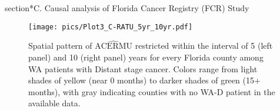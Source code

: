 \documentclass[aoas]{imsart}
\theoremstyle{plain}
\theoremstyle{definition}
\begin{document}
   









section*{C. Causal analysis of Florida Cancer Registry (FCR) Study}
\begin{figure}[ht]
\centering
\texttt{[image: pics/Plot3\_C-RATU\_5yr\_10yr.pdf]}
\caption{Spatial pattern of  $\widehat{\text{ACERMU}}$ restricted within the interval of 5 (left panel) and 10 (right panel) years for every Florida county among WA patients with Distant stage cancer. Colors range from light shades of yellow (near 0 months) to darker shades of green (15+ months), with gray indicating counties with no WA-D patient in the available data.}
\label{fig:county_atu}
\end{figure}

\printbibliography 
\end{document}
